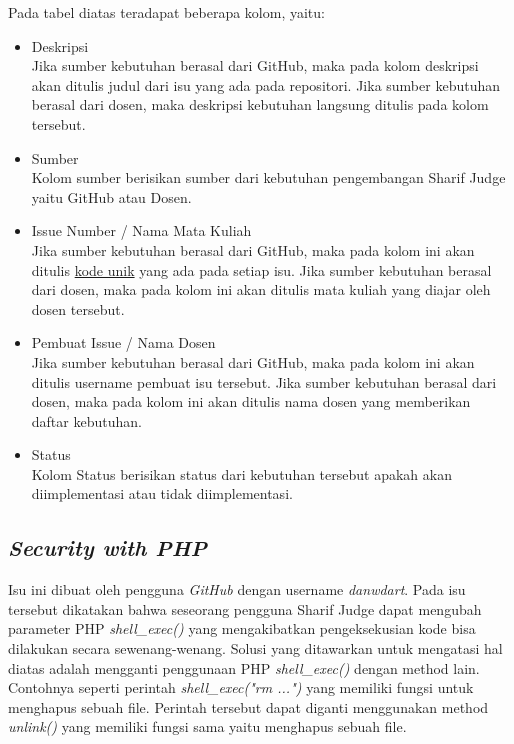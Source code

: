 Pada tabel diatas teradapat beberapa kolom, yaitu:
\begin{itemize}
	\item Deskripsi \\
	Jika sumber kebutuhan berasal dari GitHub, maka pada kolom deskripsi akan ditulis judul dari isu yang ada pada repositori. Jika sumber kebutuhan berasal dari dosen, maka deskripsi kebutuhan langsung ditulis pada kolom tersebut.
	\item Sumber \\
	Kolom sumber berisikan sumber dari kebutuhan pengembangan Sharif Judge yaitu GitHub atau Dosen.
	\item Issue Number / Nama Mata Kuliah \\
	Jika sumber kebutuhan berasal dari GitHub, maka pada kolom ini akan ditulis \hyperref[sec:analisis]{kode unik} yang ada pada setiap isu. Jika sumber kebutuhan berasal dari dosen, maka pada kolom ini akan ditulis mata kuliah yang diajar oleh dosen tersebut.
	\item Pembuat Issue / Nama Dosen \\
	Jika sumber kebutuhan berasal dari GitHub, maka pada kolom ini akan ditulis username pembuat isu tersebut. Jika sumber kebutuhan berasal dari dosen, maka pada kolom ini akan ditulis nama dosen yang memberikan daftar kebutuhan.
	\item Status \\
	Kolom Status berisikan status dari kebutuhan tersebut apakah akan diimplementasi atau tidak diimplementasi.
\end{itemize}


\subsection{\textit{Security with PHP}}
Isu ini dibuat oleh pengguna \textit{GitHub} dengan username \textit{danwdart}. Pada isu tersebut dikatakan bahwa seseorang pengguna Sharif Judge dapat mengubah parameter PHP \textit{shell\_exec()} yang mengakibatkan pengeksekusian kode bisa dilakukan secara sewenang-wenang. Solusi yang ditawarkan untuk mengatasi hal diatas adalah mengganti penggunaan PHP \textit{shell\_exec()} dengan method lain. Contohnya seperti perintah \textit{shell\_exec("rm ...")} yang memiliki fungsi untuk menghapus sebuah file. Perintah tersebut dapat diganti menggunakan method \textit{unlink()} yang memiliki fungsi sama yaitu menghapus sebuah file.
	
